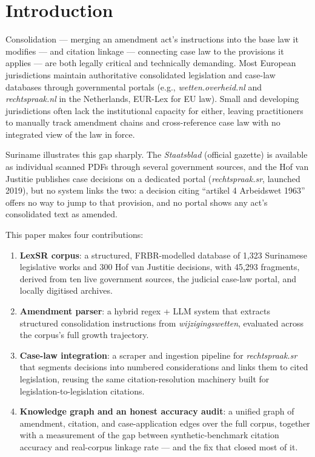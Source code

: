 \documentclass{IOS-Book-Article}
\begin{document}
\section{Introduction}

Consolidation --- merging an amendment act's instructions into the base law it modifies --- and
citation linkage --- connecting case law to the provisions it applies --- are both legally
critical and technically demanding. Most European jurisdictions maintain authoritative
consolidated legislation and case-law databases through governmental portals (e.g.,
\emph{wetten.overheid.nl} and \emph{rechtspraak.nl} in the Netherlands, EUR-Lex for EU law). Small and
developing jurisdictions often lack the institutional capacity for either, leaving
practitioners to manually track amendment chains and cross-reference case law with no
integrated view of the law in force.

Suriname illustrates this gap sharply. The \emph{Staatsblad} (official gazette) is available as
individual scanned PDFs through several government sources, and the Hof van Justitie
publishes case decisions on a dedicated portal (\emph{rechtspraak.sr}, launched 2019), but no
system links the two: a decision citing ``artikel 4 Arbeidswet 1963'' offers no way to jump to
that provision, and no portal shows any act's consolidated text as amended.

This paper makes four contributions:

\begin{enumerate}
\item \textbf{LexSR corpus}: a structured, FRBR-modelled database of 1,323 Surinamese legislative
   works and 300 Hof van Justitie decisions, with 45,293 fragments, derived from ten live
   government sources, the judicial case-law portal, and locally digitised archives.
\item \textbf{Amendment parser}: a hybrid regex + LLM system that extracts structured consolidation
   instructions from \emph{wijzigingswetten}, evaluated across the corpus's full growth trajectory.
\item \textbf{Case-law integration}: a scraper and ingestion pipeline for \emph{rechtspraak.sr} that
   segments decisions into numbered considerations and links them to cited legislation,
   reusing the same citation-resolution machinery built for legislation-to-legislation
   citations.
\item \textbf{Knowledge graph and an honest accuracy audit}: a unified graph of amendment, citation,
   and case-application edges over the full corpus, together with a measurement of the gap
   between synthetic-benchmark citation accuracy and real-corpus linkage rate --- and the fix
   that closed most of it.
\end{enumerate}
\end{document}
